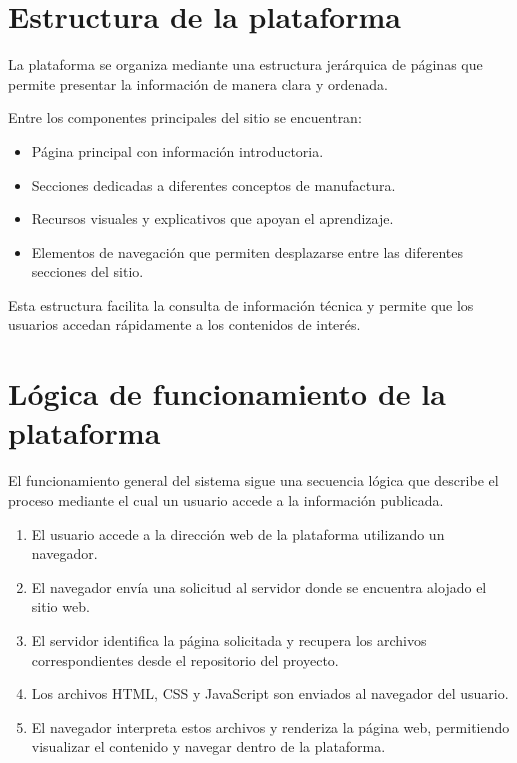 \documentclass[12pt,letterpaper]{article}
\begin{document}

\section{Estructura de la plataforma}

La plataforma se organiza mediante una estructura jerárquica de páginas que permite presentar la información de manera clara y ordenada.

Entre los componentes principales del sitio se encuentran:

\begin{itemize}

\item Página principal con información introductoria.
\item Secciones dedicadas a diferentes conceptos de manufactura.
\item Recursos visuales y explicativos que apoyan el aprendizaje.
\item Elementos de navegación que permiten desplazarse entre las diferentes secciones del sitio.

\end{itemize}

Esta estructura facilita la consulta de información técnica y permite que los usuarios accedan rápidamente a los contenidos de interés.


\section{Lógica de funcionamiento de la plataforma}

El funcionamiento general del sistema sigue una secuencia lógica que describe el proceso mediante el cual un usuario accede a la información publicada.

\begin{enumerate}

\item El usuario accede a la dirección web de la plataforma utilizando un navegador.

\item El navegador envía una solicitud al servidor donde se encuentra alojado el sitio web.

\item El servidor identifica la página solicitada y recupera los archivos correspondientes desde el repositorio del proyecto.

\item Los archivos HTML, CSS y JavaScript son enviados al navegador del usuario.

\item El navegador interpreta estos archivos y renderiza la página web, permitiendo visualizar el contenido y navegar dentro de la plataforma.

\end{enumerate}
\end{document}
